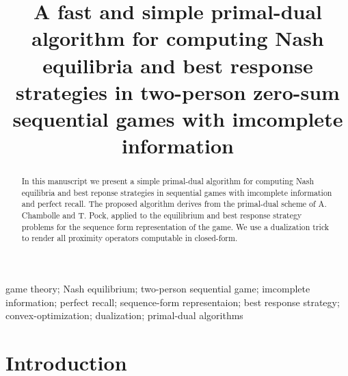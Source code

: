 \documentclass[a4paper,9pt,journal]{IEEEtran}
\begin{document}
\onecolumn
\title{A fast and simple primal-dual algorithm for computing Nash equilibria and best response strategies
  in two-person zero-sum sequential games with imcomplete information}


\author{}


\maketitle

\begin{abstract}
% 
In this manuscript we present a simple primal-dual algorithm for computing Nash equilibria and best reponse strategies in  sequential games with
imcomplete information and perfect recall. The proposed algorithm derives from the primal-dual scheme of A. Chambolle and T. Pock, applied to the
equilibrium and best response strategy problems for the sequence form representation of the game. We use a dualization trick to render all
proximity operators computable in closed-form.

\end{abstract}


\begin{IEEEkeywords}
  game theory; Nash equilibrium; two-person sequential game; imcomplete information; perfect recall; sequence-form representaion; best response strategy;
  convex-optimization; dualization; primal-dual algorithms
\end{IEEEkeywords}

\section{Introduction}
\end{document}
